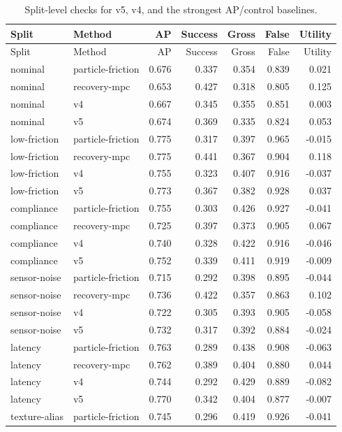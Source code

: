 \documentclass{article}
\begin{document}
\begin{longtable}{@{}llrrrrr@{}}
\caption{Split-level checks for v5, v4, and the strongest AP/control baselines.}\\
\toprule
Split & Method & AP & Success & Gross & False & Utility \\
\midrule
\endfirsthead
\toprule
Split & Method & AP & Success & Gross & False & Utility \\
\midrule
\endhead
nominal & particle-friction & 0.676 & 0.337 & 0.354 & 0.839 & 0.021 \\
nominal & recovery-mpc & 0.653 & 0.427 & 0.318 & 0.805 & 0.125 \\
nominal & v4 & 0.667 & 0.345 & 0.355 & 0.851 & 0.003 \\
nominal & v5 & 0.674 & 0.369 & 0.335 & 0.824 & 0.053 \\
low-friction & particle-friction & 0.775 & 0.317 & 0.397 & 0.965 & -0.015 \\
low-friction & recovery-mpc & 0.775 & 0.441 & 0.367 & 0.904 & 0.118 \\
low-friction & v4 & 0.755 & 0.323 & 0.407 & 0.916 & -0.037 \\
low-friction & v5 & 0.773 & 0.367 & 0.382 & 0.928 & 0.037 \\
compliance & particle-friction & 0.755 & 0.303 & 0.426 & 0.927 & -0.041 \\
compliance & recovery-mpc & 0.725 & 0.397 & 0.373 & 0.905 & 0.067 \\
compliance & v4 & 0.740 & 0.328 & 0.422 & 0.916 & -0.046 \\
compliance & v5 & 0.752 & 0.339 & 0.411 & 0.919 & -0.009 \\
sensor-noise & particle-friction & 0.715 & 0.292 & 0.398 & 0.895 & -0.044 \\
sensor-noise & recovery-mpc & 0.736 & 0.422 & 0.357 & 0.863 & 0.102 \\
sensor-noise & v4 & 0.722 & 0.305 & 0.393 & 0.905 & -0.058 \\
sensor-noise & v5 & 0.732 & 0.317 & 0.392 & 0.884 & -0.024 \\
latency & particle-friction & 0.763 & 0.289 & 0.438 & 0.908 & -0.063 \\
latency & recovery-mpc & 0.762 & 0.389 & 0.404 & 0.880 & 0.044 \\
latency & v4 & 0.744 & 0.292 & 0.429 & 0.889 & -0.082 \\
latency & v5 & 0.770 & 0.342 & 0.404 & 0.877 & -0.007 \\
texture-alias & particle-friction & 0.745 & 0.296 & 0.419 & 0.926 & -0.041 \\

\end{longtable}
\end{document}
